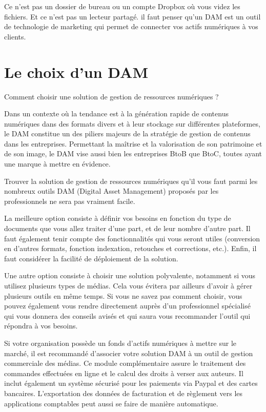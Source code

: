 Ce n'est pas un dossier de bureau ou un compte Dropbox où vous videz les fichiers. Et ce n'est pas un lecteur partagé. il faut penser qu'un DAM est un outil de technologie de marketing qui permet de connecter vos actifs numériques à vos clients.
\newline


\section{Le choix d’un DAM} 

Comment choisir une solution de gestion de ressources numériques ?

Dans un contexte où la tendance est à la génération rapide de contenus numériques dans des formats divers et à leur stockage sur différentes plateformes, le DAM constitue un des piliers majeurs de la stratégie de gestion de contenus dans les entreprises. Permettant la maîtrise et la valorisation de son patrimoine et de son image, le DAM vise aussi bien les entreprises BtoB que BtoC, toutes ayant une marque à mettre en évidence.
\newline

Trouver la solution de gestion de ressources numériques qu’il vous faut parmi les nombreux outils DAM (Digital Asset Management) proposés par les professionnels ne sera pas vraiment facile. 
\newline

La meilleure option consiste à définir vos besoins en fonction du type de documents que vous allez traiter d’une part, et de leur nombre d’autre part. Il faut également tenir compte des fonctionnalités qui vous seront utiles (conversion en d’autres formats, fonction indexation, retouches et corrections, etc.). Enfin, il faut considérer la facilité de déploiement de la solution.

Une autre option consiste à choisir une solution polyvalente, notamment si vous utilisez plusieurs types de médias. Cela vous évitera par ailleurs d’avoir à gérer plusieurs outils en même temps. Si vous ne savez pas comment choisir, vous pouvez également vous rendre directement auprès d’un professionnel spécialisé qui vous donnera des conseils avisés et qui saura vous recommander l’outil qui répondra à vos besoins.
\newline

\newpage
Si votre organisation possède un fonds d’actifs numériques à mettre sur le marché, il est recommandé d’associer votre solution DAM à  un outil de gestion commerciale des médias. Ce module complémentaire assure le traitement des commandes effectuées en ligne et le calcul des droits à verser aux auteurs. Il inclut également un système sécurisé pour les paiements via Paypal et des cartes bancaires. L’exportation des données de facturation et de règlement vers les applications comptables peut aussi se faire de manière automatique.


